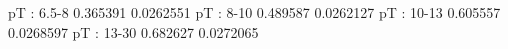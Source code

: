 pT : 6.5-8
0.365391 0.0262551
pT : 8-10
0.489587 0.0262127
pT : 10-13
0.605557 0.0268597
pT : 13-30
0.682627 0.0272065
